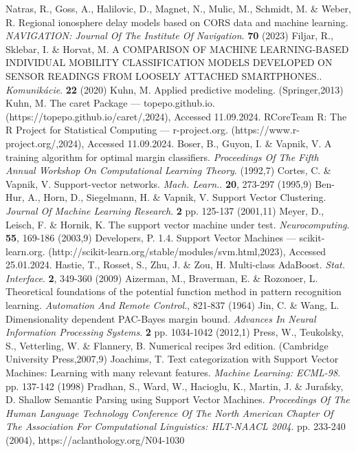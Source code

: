 \documentclass[sn-mathphys-num]{sn-jnl}%
\begin{document}
\begin{thebibliography}{000}
Natras, R., Goss, A., Halilovic, D., Magnet, N., Mulic, M., Schmidt, M. \& Weber, R. Regional ionosphere delay models based on CORS data and machine learning. {\em NAVIGATION: Journal Of The Institute Of Navigation}. \textbf{70} (2023)
Filjar, R., Sklebar, I. \& Horvat, M. A COMPARISON OF MACHINE LEARNING-BASED INDIVIDUAL MOBILITY CLASSIFICATION MODELS DEVELOPED ON SENSOR READINGS FROM LOOSELY ATTACHED SMARTPHONES.. {\em Komunikácie}. \textbf{22} (2020)
Kuhn, M. Applied predictive modeling. (Springer,2013)
Kuhn, M. The caret Package — topepo.github.io. (https://topepo.github.io/caret/,2024), Accessed 11.09.2024.
RCoreTeam R: The R Project for Statistical Computing — r-project.org. (https://www.r-project.org/,2024), Accessed 11.09.2024.
Boser, B., Guyon, I. \& Vapnik, V. A training algorithm for optimal margin classifiers. {\em Proceedings Of The Fifth Annual Workshop On Computational Learning Theory}. (1992,7)
Cortes, C. \& Vapnik, V. Support-vector networks. {\em Mach. Learn.}. \textbf{20}, 273-297 (1995,9)
Ben-Hur, A., Horn, D., Siegelmann, H. \& Vapnik, V. Support Vector Clustering. {\em Journal Of Machine Learning Research}. \textbf{2} pp. 125-137 (2001,11)
Meyer, D., Leisch, F. \& Hornik, K. The support vector machine under test. {\em Neurocomputing}. \textbf{55}, 169-186 (2003,9)
Developers, P. 1.4. Support Vector Machines — scikit-learn.org. (http://scikit-learn.org/stable/modules/svm.html,2023), Accessed 25.01.2024.
Hastie, T., Rosset, S., Zhu, J. \& Zou, H. Multi-class AdaBoost. {\em Stat. Interface}. \textbf{2}, 349-360 (2009)
Aizerman, M., Braverman, E. \& Rozonoer, L. Theoretical foundations of the potential function method in pattern recognition learning. {\em Automation And Remote Control}., 821-837 (1964)
Jin, C. \& Wang, L. Dimensionality dependent PAC-Bayes margin bound. {\em Advances In Neural Information Processing Systems}. \textbf{2} pp. 1034-1042 (2012,1)
Press, W., Teukolsky, S., Vetterling, W. \& Flannery, B. Numerical recipes 3rd edition. (Cambridge University Press,2007,9)
Joachims, T. Text categorization with Support Vector Machines: Learning with many relevant features. {\em Machine Learning: ECML-98}. pp. 137-142 (1998)
Pradhan, S., Ward, W., Hacioglu, K., Martin, J. \& Jurafsky, D. Shallow Semantic Parsing using Support Vector Machines. {\em Proceedings Of The Human Language Technology Conference Of The North American Chapter Of The Association For Computational Linguistics: HLT-NAACL 2004}. pp. 233-240 (2004), https://aclanthology.org/N04-1030

\end{thebibliography}
\end{document}

